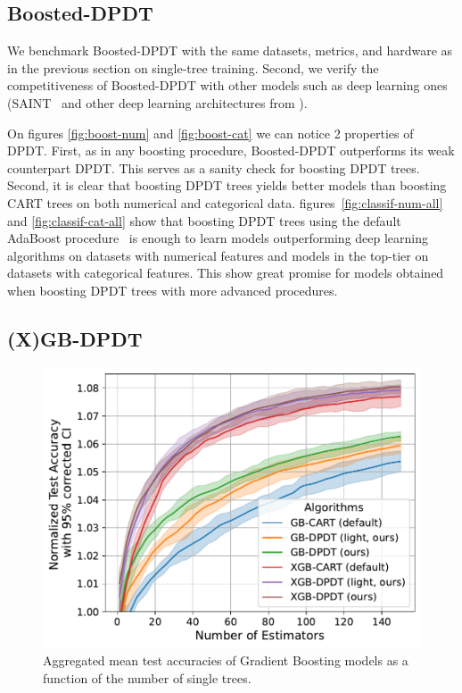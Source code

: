 \subsection{Boosted-DPDT}\label{sec:boosting}

We benchmark Boosted-DPDT with the same datasets, metrics, and hardware as in the previous section on single-tree training. Second, we verify the competitiveness of Boosted-DPDT with other models such as deep learning ones (SAINT~\cite{somepalli2021saintimprovedneuralnetworks} and other deep learning architectures from \cite{resnet}). 

On figures \ref{fig:boost-num} and \ref{fig:boost-cat} we can notice 2 properties of DPDT. First, as in any boosting procedure, Boosted-DPDT outperforms its weak counterpart DPDT. This serves as a sanity check for boosting DPDT trees. Second, it is clear that boosting DPDT trees yields better models than boosting CART trees on both numerical and categorical data. figures~\ref{fig:classif-num-all} and \ref{fig:classif-cat-all} show that boosting DPDT trees using the default AdaBoost procedure~\cite{FREUND1997119} is enough to learn models outperforming deep learning algorithms on datasets with numerical features and models in the top-tier on datasets with categorical features. This show great promise for models obtained when boosting DPDT trees with more advanced procedures.

\subsection{(X)GB-DPDT}
\begin{figure}
    \centering
    \includegraphics[trim={0 0 0 0},clip,width=0.6\linewidth]{images/figures/xgboosting_normalized_wo_opt.pdf}
    \caption{Aggregated mean test accuracies of Gradient Boosting models as a function of the number of single trees.}
    \label{fig:gb}
\end{figure}


